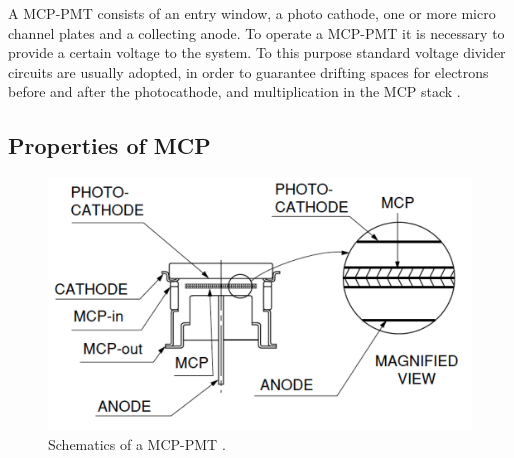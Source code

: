 A MCP-PMT consists of an entry window, a photo cathode, one or more micro channel plates and a collecting anode.
To operate a MCP-PMT it is necessary to provide a certain voltage to the system. To this purpose standard voltage divider circuits are usually adopted, in order to guarantee drifting spaces for electrons before and after the photocathode, and multiplication in the MCP stack \cite{Hama2006}.

  
\subsection{Properties of MCP}
\begin{figure}[htbp]
\begin{center}
\includegraphics[width=12cm]{../Pictures/Chapter_3/MCP_struct}
\end{center}
\caption[MCP schematics]{Schematics of a MCP-PMT \cite{Hama2006}.}
\label{fig:MCP_struct}
\end{figure}

